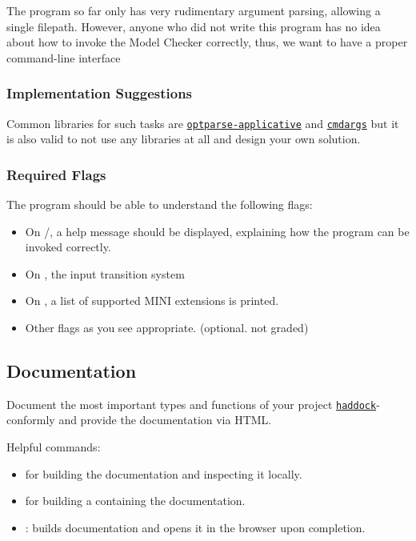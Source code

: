 \documentclass{article}
\begin{document}
The program so far only has very rudimentary argument parsing, allowing a single filepath.
However, anyone who did not write this program has no idea about how to invoke the Model Checker correctly,
thus, we want to have a proper command-line interface

\subsubsection*{Implementation Suggestions}

Common libraries for such tasks are \href{https://hackage.haskell.org/package/optparse-applicative}{\texttt{optparse-applicative}} 
and \href{https://hackage.haskell.org/package/cmdargs}{\texttt{cmdargs}} but it is also valid to not use any libraries at all 
and design your own solution.

\subsubsection*{Required Flags}

The program should be able to understand the following flags:

\begin{itemize}
\item On /, a help message should be displayed, explaining how the program can be invoked correctly.
\item On , the input transition system
\item On , a list of supported MINI extensions is printed.
\item Other flags as you see appropriate. (optional. not graded)
\end{itemize}

\subsection{Documentation}

Document the most important types and functions of your project \href{https://haskell-haddock.readthedocs.io/en/latest/markup.html}{\texttt{haddock}}-conformly and provide the documentation via HTML.

Helpful commands:

\begin{itemize}
\item {} for building the documentation and inspecting it locally.
\item {} for building a  containing the documentation.
\item {}: builds documentation and opens it in the browser upon completion.
\end{itemize}
\end{document}
